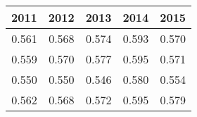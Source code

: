 \begin{tabular}{rrrrr}
\toprule
2011 & 2012 & 2013 & 2014 & 2015 \\
\midrule
0.561 & 0.568 & 0.574 & 0.593 & 0.570 \\
0.559 & 0.570 & 0.577 & 0.595 & 0.571 \\
0.550 & 0.550 & 0.546 & 0.580 & 0.554 \\
0.562 & 0.568 & 0.572 & 0.595 & 0.579 \\
\bottomrule
\end{tabular}
